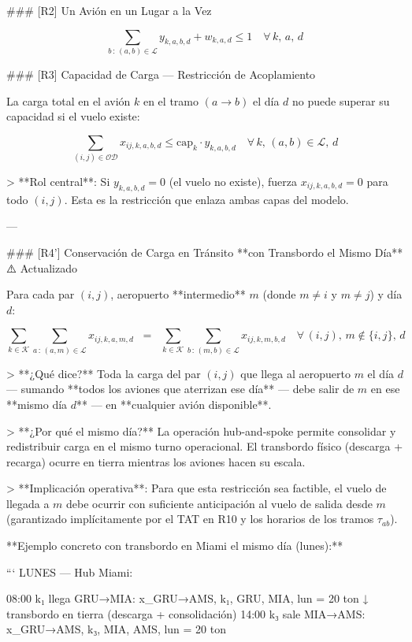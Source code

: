 ### [R2] Un Avión en un Lugar a la Vez

$$
\sum_{b \,:\, (a,b) \in \mathcal{L}} y_{k,a,b,d} + w_{k,a,d} \leq 1 \quad \forall\, k,\, a,\, d
$$

### [R3] Capacidad de Carga — Restricción de Acoplamiento

La carga total en el avión $k$ en el tramo $(a \to b)$ el día $d$ no puede superar su capacidad si el vuelo existe:

$$
\sum_{(i,j) \in \mathcal{OD}} x_{ij,k,a,b,d} \leq \text{cap}_k \cdot y_{k,a,b,d} \quad \forall\, k,\, (a,b) \in \mathcal{L},\, d
$$

> **Rol central**: Si $y_{k,a,b,d} = 0$ (el vuelo no existe), fuerza $x_{ij,k,a,b,d} = 0$ para todo $(i,j)$. Esta es la restricción que enlaza ambas capas del modelo.

---

### [R4'] Conservación de Carga en Tránsito **con Transbordo el Mismo Día** ⚠️ Actualizado

Para cada par $(i,j)$, aeropuerto **intermedio** $m$ (donde $m \neq i$ y $m \neq j$) y día $d$:

$$
\sum_{k \in \mathcal{K}} \sum_{a \,:\, (a,m) \in \mathcal{L}} x_{ij,k,a,m,d} \;\;=\;\; \sum_{k \in \mathcal{K}} \sum_{b \,:\, (m,b) \in \mathcal{L}} x_{ij,k,m,b,d} \quad \forall\, (i,j),\, m \notin \{i,j\},\, d
$$

> **¿Qué dice?** Toda la carga del par $(i,j)$ que llega al aeropuerto $m$ el día $d$ — sumando **todos los aviones que aterrizan ese día** — debe salir de $m$ en ese **mismo día $d$** — en **cualquier avión disponible**.

> **¿Por qué el mismo día?** La operación hub-and-spoke permite consolidar y redistribuir carga en el mismo turno operacional. El transbordo físico (descarga + recarga) ocurre en tierra mientras los aviones hacen su escala.

> **Implicación operativa**: Para que esta restricción sea factible, el vuelo de llegada a $m$ debe ocurrir con suficiente anticipación al vuelo de salida desde $m$ (garantizado implícitamente por el TAT en R10 y los horarios de los tramos $\tau_{ab}$).

**Ejemplo concreto con transbordo en Miami el mismo día (lunes):**

```
LUNES — Hub Miami:

  08:00  k₁ llega GRU→MIA:   x_{GRU→AMS, k₁, GRU, MIA, lun} = 20 ton
           ↓ transbordo en tierra (descarga + consolidación)
  14:00  k₃ sale MIA→AMS:   x_{GRU→AMS, k₃, MIA, AMS, lun} = 20 ton

